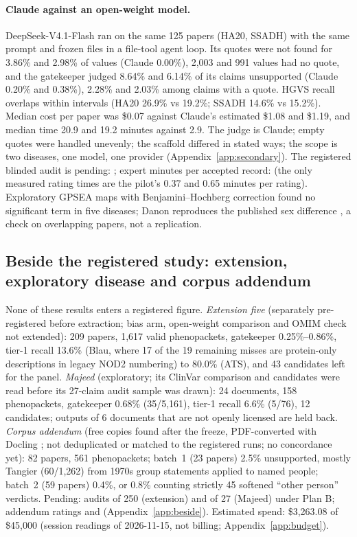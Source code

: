 \documentclass{article} %
\begin{document}
\paragraph{Claude against an open-weight model.} DeepSeek-V4.1-Flash \citep{Deepseekai2026Deepseekv4Towards} ran on the same 125 papers (HA20, SSADH) with the same prompt and frozen files in a file-tool agent loop. Its quotes were not found for 3.86\% and 2.98\% of values (Claude 0.00\%), 2,003 and 991 values had no quote, and the gatekeeper judged 8.64\% and 6.14\% of its claims unsupported (Claude 0.20\% and 0.38\%), 2.28\% and 2.03\% among claims with a quote. HGVS recall overlaps within intervals (HA20 26.9\% vs 19.2\%; SSADH 14.6\% vs 15.2\%). Median cost per paper was \$0.07 against Claude's estimated \$1.08 and \$1.19, and median time 20.9 and 19.2 minutes against 2.9. The judge is Claude; empty quotes were handled unevenly; the scaffold differed in stated ways; the scope is two diseases, one model, one provider (Appendix~\ref{app:secondary}). The registered blinded audit is pending: ; expert minutes per accepted record:  (the only measured rating times are the pilot's 0.37 and 0.65 minutes per rating). Exploratory GPSEA maps \citep{rekerle2026_gpsea} with Benjamini--Hochberg correction \citep{Benjamini1995ControllingFalse} found no significant term in five diseases; Danon reproduces the published sex difference \citep{boucek2011_danon_natural_history}, a check on overlapping papers, not a replication.

\subsection{Beside the registered study: extension, exploratory disease and corpus addendum}
\label{sec:beside}
None of these results enters a registered figure. \emph{Extension five} (separately pre-registered before extraction; bias arm, open-weight comparison and OMIM check not extended): 209 papers, 1,617 valid phenopackets, gatekeeper 0.25\%--0.86\%, tier-1 recall 13.6\% (Blau, where 17 of the 19 remaining misses are protein-only descriptions in legacy NOD2 numbering) to 80.0\% (ATS), and 43 candidates left for the panel. \emph{Majeed} (exploratory; its ClinVar comparison and candidates were read before its 27-claim audit sample was drawn): 24 documents, 158 phenopackets, gatekeeper 0.68\% (35/5,161), tier-1 recall 6.6\% (5/76), 12 candidates; outputs of 6 documents that are not openly licensed are held back. \emph{Corpus addendum} (free copies found after the freeze, PDF-converted with Docling \citep{Auer2024DoclingTechnical}; not deduplicated or matched to the registered runs; no concordance yet): 82 papers, 561 phenopackets; batch~1 (23 papers) 2.5\% unsupported, mostly Tangier (60/1,262) from 1970s group statements applied to named people; batch~2 (59 papers) 0.4\%, or 0.8\% counting strictly 45 softened ``other person'' verdicts. Pending: audits  of 250 (extension) and  of 27 (Majeed) under Plan B; addendum ratings  and  (Appendix~\ref{app:beside}). Estimated spend: \$3,263.08 of \$45,000 (session readings of 2026-11-15, not billing; Appendix~\ref{app:budget}).
\end{document}
